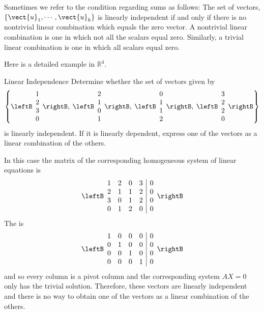 Sometimes we refer to the condition regarding sums as follows: The set
of vectors, $\left\{ \vect{u}_{1},\cdots ,\vect{u}_{k}\right\} $ is
linearly independent if and only if there is no nontrivial linear
combination which equals the zero vector. A nontrivial linear
combination is one in which not all the scalars equal zero. Similarly,
a trivial linear combination is one in which all scalars equal zero.

Here is a detailed  example in  $\mathbb{R}^{4}$. 

\begin{example}{Linear Independence}\label{exa:linearindependence2}
Determine whether the set of vectors given by  
\[ \left\{ \leftB
\begin{array}{r}
1 \\
2 \\
3 \\
0
\end{array}
\rightB, \; \leftB
\begin{array}{r}
2 \\
1 \\
0 \\
1
\end{array}
\rightB , \; \leftB
\begin{array}{r}
0 \\
1 \\
1 \\
2
\end{array}
\rightB  , \; \leftB
\begin{array}{r}
3 \\
2 \\
2 \\
0
\end{array}
\rightB \right\} \]
is linearly independent. If it is linearly dependent,
express one of the vectors as a linear combination of the others.
\end{example}

\begin{solution}
In this case the matrix of the corresponding homogeneous system of linear equations  is 
\begin{equation*}
\leftB 
\begin{array}{rrrr|r}
1 & 2 & 0 & 3 & 0\\ 
2 & 1 & 1 & 2 & 0 \\ 
3 & 0 & 1 & 2 & 0 \\ 
0 & 1 & 2 & 0 & 0 
\end{array}
\rightB
\end{equation*}
The \rref \;is 
\begin{equation*}
\leftB 
\begin{array}{rrrr|r}
1 & 0 & 0 & 0 & 0 \\ 
0 & 1 & 0 & 0 & 0 \\ 
0 & 0 & 1 & 0 & 0 \\ 
0 & 0 & 0 & 1 & 0 
\end{array}
\rightB
\end{equation*}
and so every column is a pivot column and the corresponding system
$AX=0$ only has the trivial solution.  Therefore, these vectors are
linearly independent and there is no way to obtain one of the vectors
as a linear combination of the others.
\end{solution}

